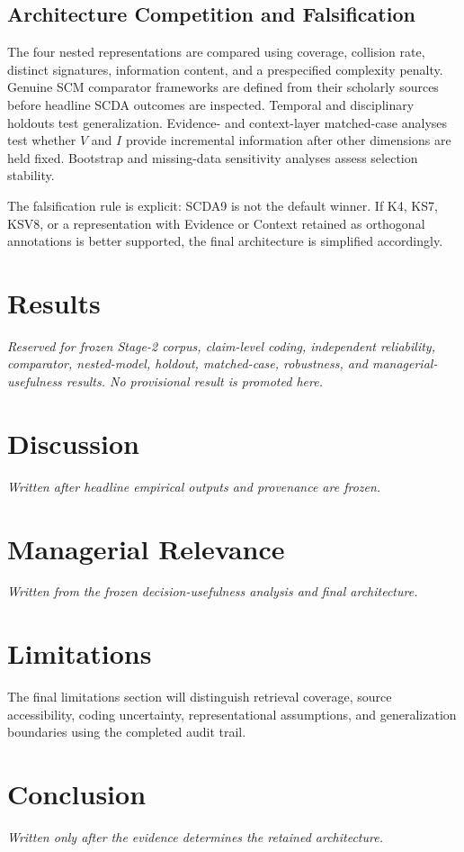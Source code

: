 \documentclass[journal]{IEEEtran}
\begin{document}
\subsection{Architecture Competition and Falsification}
The four nested representations are compared using coverage, collision rate, distinct signatures, information content, and a prespecified complexity penalty. Genuine SCM comparator frameworks are defined from their scholarly sources before headline SCDA outcomes are inspected. Temporal and disciplinary holdouts test generalization. Evidence- and context-layer matched-case analyses test whether \(V\) and \(I\) provide incremental information after other dimensions are held fixed. Bootstrap and missing-data sensitivity analyses assess selection stability.

The falsification rule is explicit: SCDA9 is not the default winner. If K4, KS7, KSV8, or a representation with Evidence or Context retained as orthogonal annotations is better supported, the final architecture is simplified accordingly.

\section{Results}
\textit{Reserved for frozen Stage-2 corpus, claim-level coding, independent reliability, comparator, nested-model, holdout, matched-case, robustness, and managerial-usefulness results. No provisional result is promoted here.}

\section{Discussion}
\textit{Written after headline empirical outputs and provenance are frozen.}

\section{Managerial Relevance}
\textit{Written from the frozen decision-usefulness analysis and final architecture.}

\section{Limitations}
The final limitations section will distinguish retrieval coverage, source accessibility, coding uncertainty, representational assumptions, and generalization boundaries using the completed audit trail.

\section{Conclusion}
\textit{Written only after the evidence determines the retained architecture.}



\end{document}
